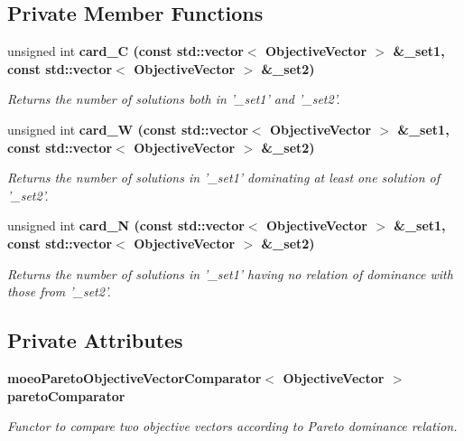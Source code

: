 \subsection*{Private Member Functions}
\begin{CompactItemize}
\item 
unsigned int \bf{card\_\-C} (const std::vector$<$ Objective\-Vector $>$ \&\_\-set1, const std::vector$<$ Objective\-Vector $>$ \&\_\-set2)
\begin{CompactList}\small\item\em Returns the number of solutions both in '\_\-set1' and '\_\-set2'. \item\end{CompactList}\item 
unsigned int \bf{card\_\-W} (const std::vector$<$ Objective\-Vector $>$ \&\_\-set1, const std::vector$<$ Objective\-Vector $>$ \&\_\-set2)
\begin{CompactList}\small\item\em Returns the number of solutions in '\_\-set1' dominating at least one solution of '\_\-set2'. \item\end{CompactList}\item 
unsigned int \bf{card\_\-N} (const std::vector$<$ Objective\-Vector $>$ \&\_\-set1, const std::vector$<$ Objective\-Vector $>$ \&\_\-set2)
\begin{CompactList}\small\item\em Returns the number of solutions in '\_\-set1' having no relation of dominance with those from '\_\-set2'. \item\end{CompactList}\end{CompactItemize}
\subsection*{Private Attributes}
\begin{CompactItemize}
\item 
\bf{moeo\-Pareto\-Objective\-Vector\-Comparator}$<$ Objective\-Vector $>$ \bf{pareto\-Comparator}\label{classmoeoContributionMetric_b474229c85ffbf5108f51eef01ab2d64}

\begin{CompactList}\small\item\em Functor to compare two objective vectors according to Pareto dominance relation. \item\end{CompactList}\end{CompactItemize}


